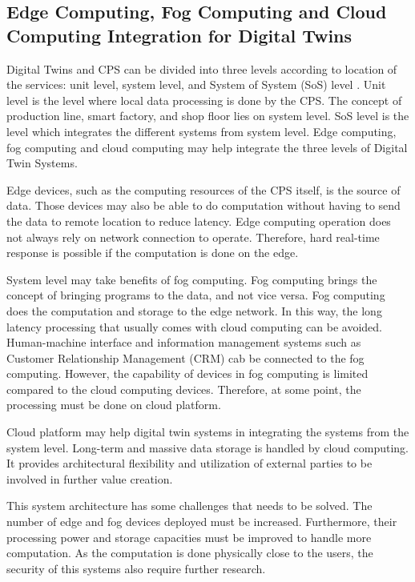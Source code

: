 \documentclass[article]{aaltoseries}
\begin{document}
\subsection{Edge Computing, Fog Computing and Cloud Computing Integration for Digital Twins}
Digital Twins and CPS can be divided into three levels according to location of the services: unit level, system level, and System of System (SoS) level \cite{qi2018modeling}. Unit level is the level where local data processing is done by the CPS. The concept of production line, smart factory, and shop floor lies on system level. SoS level is the level which integrates the different systems from system level. Edge computing, fog computing and cloud computing may help integrate the three levels of Digital Twin Systems.

Edge devices, such as the computing resources of the CPS itself, is the source of data. Those devices may also be able to do computation without having to send the data to remote location to reduce latency. Edge computing operation does not always rely on network connection to operate. Therefore, hard real-time response is possible if the computation is done on the edge.

System level may take benefits of fog computing. Fog computing brings the concept of bringing programs to the data, and not vice versa. Fog computing does the computation and storage to the edge network. In this way, the long latency processing that usually comes with cloud computing can be avoided. Human-machine interface and information management systems such as Customer Relationship Management (CRM) cab be connected to the fog computing. However, the capability of devices in fog computing is limited compared to the cloud computing devices. Therefore, at some point, the processing must be done on cloud platform. 

Cloud platform may help digital twin systems in integrating the systems from the system level. Long-term and massive data storage is handled by cloud computing. It provides architectural flexibility and utilization of external parties to be involved in further value creation.

This system architecture has some challenges that needs to be solved. The number of edge and fog devices deployed must be increased. Furthermore, their processing power and storage capacities must be improved to handle more computation. As the computation is done physically close to the users, the security of this systems also require further research.
\end{document}
